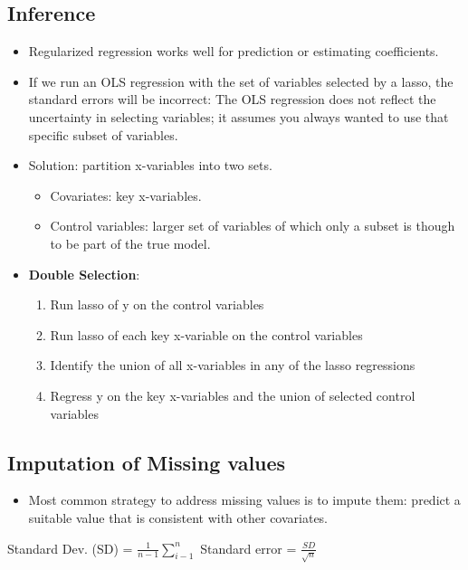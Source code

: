 \documentclass[12pt, oneside]{article}
\begin{document}
\subsection{Inference}
\begin{itemize}
    \item Regularized regression works well for prediction or estimating coefficients. 
    \item If we run an OLS regression with the set of variables selected by a lasso, the standard errors will be incorrect: The OLS regression does
    not reflect the uncertainty in selecting variables; it assumes you always wanted to use that specific subset of variables. 
    \item Solution: partition x-variables into two sets. 
    \begin{itemize}
        \item Covariates: key x-variables.
        \item Control variables: larger set of variables of which only a subset is though to be part of the true model.
    \end{itemize}
    
    \item \textbf{Double Selection}:
    \begin{enumerate}
        \item Run lasso of y on the control variables
        \item Run lasso of each key x-variable on the control variables
        \item Identify the union of all x-variables in any of the lasso regressions
        \item Regress y on the key x-variables and the union of selected control variables
    \end{enumerate}
\end{itemize}

\subsection{Imputation of Missing values}
\begin{itemize}
    \item Most common strategy to address missing values is to impute them: predict a suitable value that is consistent with other covariates.
\end{itemize}

Standard Dev. (SD) = $\frac{1}{n-1}\sum^n_{i-1}$
Standard error = $\frac{SD}{\sqrt{n}}$
\end{document}
